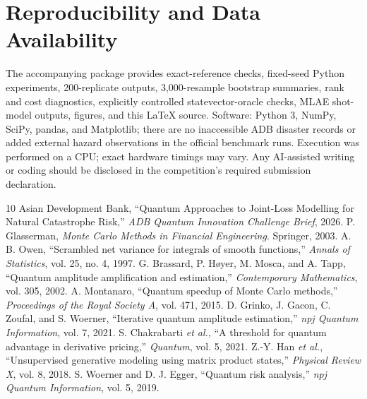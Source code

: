 \documentclass[10pt,conference]{IEEEtran}
\begin{document}
\section*{Reproducibility and Data Availability}
The accompanying package provides exact-reference checks, fixed-seed Python experiments, 200-replicate outputs, 3,000-resample bootstrap summaries, rank and cost diagnostics, explicitly controlled statevector-oracle checks, MLAE shot-model outputs, figures, and this \LaTeX{} source. Software: Python 3, NumPy, SciPy, pandas, and Matplotlib; there are no inaccessible ADB disaster records or added external hazard observations in the official benchmark runs. Execution was performed on a CPU; exact hardware timings may vary. Any AI-assisted writing or coding should be disclosed in the competition's required submission declaration.

\begin{thebibliography}{10}
 Asian Development Bank, ``Quantum Approaches to Joint-Loss Modelling for Natural Catastrophe Risk,'' \emph{ADB Quantum Innovation Challenge Brief}, 2026.
 P. Glasserman, \emph{Monte Carlo Methods in Financial Engineering}. Springer, 2003.
 A. B. Owen, ``Scrambled net variance for integrals of smooth functions,'' \emph{Annals of Statistics}, vol. 25, no. 4, 1997.
 G. Brassard, P. H\o yer, M. Mosca, and A. Tapp, ``Quantum amplitude amplification and estimation,'' \emph{Contemporary Mathematics}, vol. 305, 2002.
 A. Montanaro, ``Quantum speedup of Monte Carlo methods,'' \emph{Proceedings of the Royal Society A}, vol. 471, 2015.
 D. Grinko, J. Gacon, C. Zoufal, and S. Woerner, ``Iterative quantum amplitude estimation,'' \emph{npj Quantum Information}, vol. 7, 2021.
 S. Chakrabarti \emph{et al.}, ``A threshold for quantum advantage in derivative pricing,'' \emph{Quantum}, vol. 5, 2021.
 Z.-Y. Han \emph{et al.}, ``Unsupervised generative modeling using matrix product states,'' \emph{Physical Review X}, vol. 8, 2018.
 S. Woerner and D. J. Egger, ``Quantum risk analysis,'' \emph{npj Quantum Information}, vol. 5, 2019.
\end{thebibliography}
\end{document}
